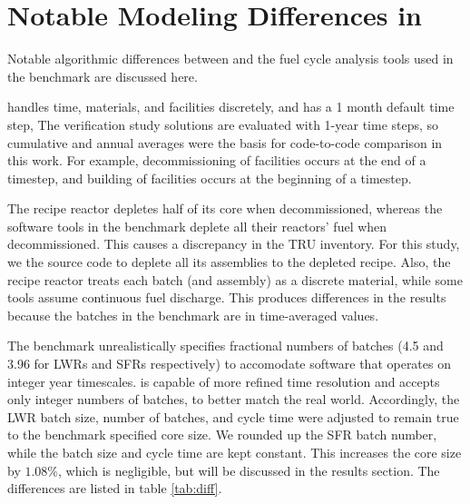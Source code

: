 
\section{Notable Modeling Differences in \Cyclus}

Notable algorithmic differences between \Cyclus and the fuel cycle analysis 
tools used in the benchmark \cite{feng_standardized_2016} are discussed here.

\Cyclus handles time, materials, and facilities discretely, and has a 1 month 
default time step,
The verification study solutions are evaluated with 1-year time steps, so cumulative and annual averages
were the basis for code-to-code comparison in this work.
For example, decommissioning of
facilities occurs at the end of a timestep, and building of facilities
occurs at the beginning of a timestep.

The \Cycamore recipe reactor depletes half of its core when decommissioned,
whereas the software tools in the benchmark \cite{feng_standardized_2016} deplete all their reactors' fuel when decommissioned.
This causes a discrepancy in the \gls{TRU} inventory. For this study, we 
the \Cycamore source code to deplete all its assemblies to the depleted recipe.
Also, the \Cycamore recipe reactor treats each batch (and assembly) as a discrete
material, while some tools assume continuous fuel discharge. This produces
differences in the results because the batches in the benchmark \cite{feng_standardized_2016} are in time-averaged values.

The benchmark unrealistically specifies fractional numbers of batches (4.5 and 
3.96 for \glspl{LWR} and \glspl{SFR} respectively) to 
accomodate software that operates on integer year timescales. \Cyclus is 
capable of more refined time resolution and accepts only integer 
numbers of batches, to better match the real world. Accordingly, the \gls{LWR} batch size, number of batches, and cycle time 
were adjusted to remain true to the benchmark specified core size. We rounded
up the \gls{SFR} batch number, while the batch size and cycle time are kept constant.
This increases the core size by $1.08 \%$, which is negligible, but will be
discussed in the results section.
The differences are listed in table \ref{tab:diff}.

